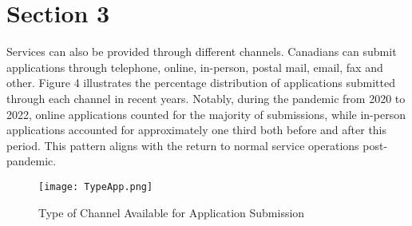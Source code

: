 \section{Section 3}

Services can also be provided through different channels. Canadians can submit 
applications through telephone, online, in-person, postal mail, email, fax and 
other. Figure 4 illustrates the percentage distribution of applications submitted 
through each channel in recent years. Notably, during the pandemic from 2020 to 
2022, online applications counted for the majority of submissions, while 
in-person applications accounted for approximately one third both before and 
after this period. This pattern aligns with the return to normal service 
operations post-pandemic.

\begin{figure}[H]
    \centering
    \texttt{[image: TypeApp.png]}
    \caption{\label{fig:TypeApp}Type of Channel Available for Application Submission}
\end{figure}
